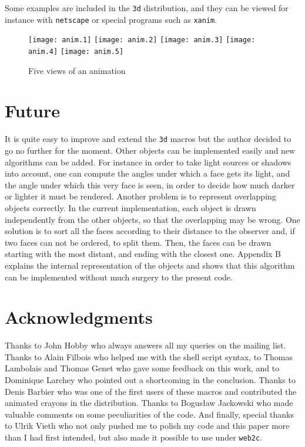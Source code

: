 \documentclass[nonumber,harvardcite]{ltugboat}
\begin{document}
Some examples are included in the \verb|3d| distribution, and they
can be viewed for instance with \texttt{netscape} or
special programs such as \verb|xanim|.

\begin{figure}
\texttt{[image: anim.1]}\hfill
\texttt{[image: anim.2]}\hfill
\texttt{[image: anim.3]}\hfill
\texttt{[image: anim.4]}\hfill
\texttt{[image: anim.5]}

\caption{Five views of an animation}\label{anim-five-views}
\end{figure}

\section{Future}

It is quite easy to improve and extend the \verb|3d| macros but the
author decided to go no further for the moment. Other objects can
be implemented easily and new algorithms can be added. For instance
in order to take light sources or shadows into account, one can compute
the angles under which a face gets its light, and the angle under which
this very face is seen, in order to decide how much darker or lighter
it must be rendered. Another problem is to represent
overlapping objects correctly. In the current implementation, each
object is drawn
independently from the other objects, so that the overlapping may be wrong.
One solution is to sort all the faces according to their distance
to the observer and, if two faces can not be ordered, to split them.
Then, the faces can be drawn starting with the most distant, and
ending with the closest one.
Appendix B explains the internal representation of the objects and
shows that this algorithm can be implemented without much surgery to 
the present code. 

\section{Acknowledgments}

Thanks to John Hobby who always answers all my queries on the \MF{} mailing
list. Thanks to Alain Filbois who helped me with the shell script
syntax, to Thomas Lambolais and Thomas Genet who gave some feedback
on this work, and to Dominique Larchey who pointed out a shortcoming
in the conclusion. Thanks to Denis Barbier who 
was one of the first users of these
macros and contributed the animated crayons in the distribution. Thanks to
Bogus\l aw Jackowski who made valuable comments on some peculiarities of
the code.
And finally, special thanks to Ulrik Vieth who not only
pushed me to polish my code and this paper more than I had first intended,
but also made it possible to use \MP{} under \texttt{web2c}.
\end{document}
